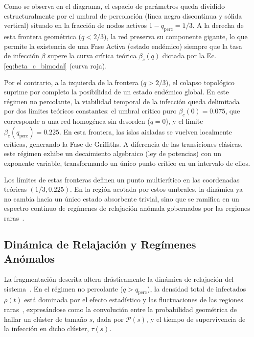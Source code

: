 \documentclass[%
reprint,
amsmath,amssymb,
aps,
]{revtex4-2}
\begin{document}
	Como se observa en el diagrama, el espacio de parámetros queda dividido estructuralmente por el umbral de percolación (línea negra discontinua y sólida vertical) situado en la fracción de nodos activos $1 - q_{\text{perc}} = 1/3$. A la derecha de esta frontera geométrica ($q < 2/3$), la red preserva su componente gigante, lo que permite la existencia de una Fase Activa (estado endémico) siempre que la tasa de infección $\beta$ supere la curva crítica teórica $\beta_c(q)$ dictada por la Ec. \ref{eq:beta_c_bimodal} (curva roja).
	
	Por el contrario, a la izquierda de la frontera ($q > 2/3$), el colapso topológico suprime por completo la posibilidad de un estado endémico global. En este régimen no percolante, la viabilidad temporal de la infección queda delimitada por dos límites teóricos constantes: el umbral crítico puro $\beta_c(0) = 0.075$, que corresponde a una red homogénea sin desorden ($q=0$), y el límite $\beta_c(q_{\text{perc}}) = 0.225$. En esta frontera, las islas aisladas se vuelven localmente críticas, generando la Fase de Griffiths. A diferencia de las transiciones clásicas, este régimen exhibe un decaimiento algebraico (ley de potencias) con un exponente variable, transformando un único punto crítico en un intervalo de ellos.
	
	Los límites de estas fronteras definen un punto multicrítico en las coordenadas teóricas $(1/3, 0.225)$. En la región acotada por estos umbrales, la dinámica ya no cambia hacia un único estado absorbente trivial, sino que se ramifica en un espectro continuo de regímenes de relajación anómala gobernados por las regiones raras~\cite{Muñoz2010}.
	
	\subsection{Dinámica de Relajación y Regímenes Anómalos}
	
	La fragmentación descrita altera drásticamente la dinámica de relajación del sistema~\cite{Muñoz2010,Noest1986,Odor2004}. En el régimen no percolante ($q > q_{\text{perc}}$), la densidad total de infectados $\rho(t)$ está dominada por el efecto estadístico y las fluctuaciones de las regiones raras~\cite{Muñoz2010,Noest1986,Bray1987,Vojta_2006}, expresándose como la convolución entre la probabilidad geométrica de hallar un clúster de tamaño $s$, dada por $\mathcal{P}(s)$, y el tiempo de supervivencia de la infección en dicho clúster, $\tau(s)$.
	
\end{document}
